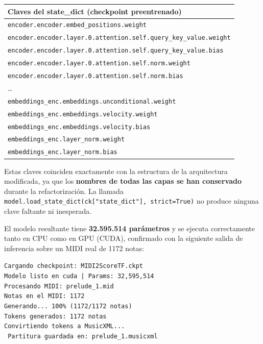 \documentclass[12pt,a4paper]{article}
\begin{document}
\begin{center}
\small
\begin{tabular}{l}
\toprule
\textbf{Claves del state\_dict (checkpoint preentrenado)} \\
\midrule
\texttt{encoder.encoder.embed\_positions.weight} \\
\texttt{encoder.encoder.layer.0.attention.self.query\_key\_value.weight} \\
\texttt{encoder.encoder.layer.0.attention.self.query\_key\_value.bias} \\
\texttt{encoder.encoder.layer.0.attention.self.norm.weight} \\
\texttt{encoder.encoder.layer.0.attention.self.norm.bias} \\
\ldots \\
\texttt{embeddings\_enc.embeddings.unconditional.weight} \\
\texttt{embeddings\_enc.embeddings.velocity.weight} \\
\texttt{embeddings\_enc.embeddings.velocity.bias} \\
\texttt{embeddings\_enc.layer\_norm.weight} \\
\texttt{embeddings\_enc.layer\_norm.bias} \\
\bottomrule
\end{tabular}
\end{center}

Estas claves coinciden exactamente con la estructura de la arquitectura modificada,
ya que los \textbf{nombres de todas las capas se han conservado} durante la
refactorización. La llamada \texttt{model.load\_state\_dict(ck["state\_dict"],
strict=True)} no produce ninguna clave faltante ni inesperada.

El modelo resultante tiene \textbf{32.595.514 parámetros} y se ejecuta correctamente
tanto en CPU como en GPU (CUDA), confirmado con la siguiente salida de inferencia sobre
un MIDI real de 1172 notas:

\begin{fixbox}
\texttt{Cargando checkpoint: MIDI2ScoreTF.ckpt}\\
\texttt{Modelo listo en cuda | Params: 32,595,514}\\
\texttt{Procesando MIDI: prelude\_1.mid}\\
\texttt{Notas en el MIDI: 1172}\\
\texttt{Generando... 100\% (1172/1172 notas)}\\
\texttt{Tokens generados: 1172 notas}\\
\texttt{Convirtiendo tokens a MusicXML...}\\
\texttt{\checkmark\ Partitura guardada en: prelude\_1.musicxml}
\end{fixbox}
\end{document}
